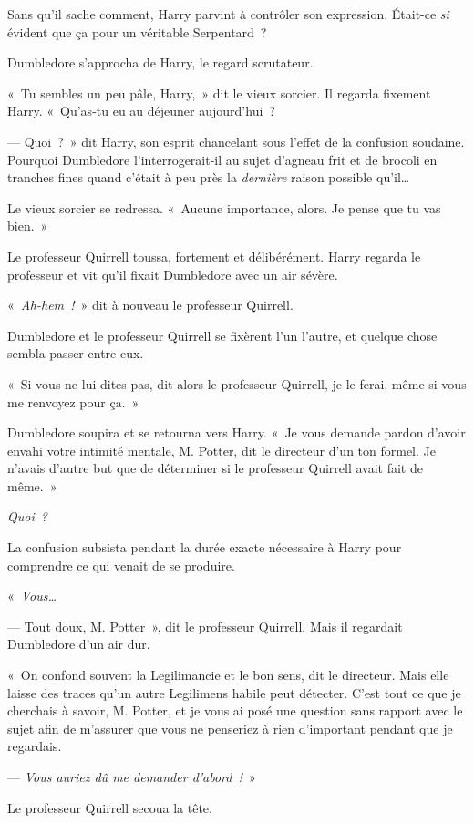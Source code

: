 Sans qu'il sache comment, Harry parvint à contrôler son expression.
Était-ce \emph{si} évident que ça pour un véritable Serpentard~?

Dumbledore s'approcha de Harry, le regard scrutateur.

«~Tu sembles un peu pâle, Harry,~» dit le vieux sorcier.
Il regarda fixement Harry.
«~Qu'as-tu eu au déjeuner aujourd'hui~?

--- Quoi~?~»
dit Harry, son esprit chancelant sous l'effet de la confusion soudaine.
Pourquoi Dumbledore l'interrogerait-il au sujet d'agneau frit et de brocoli en tranches fines quand c'était à peu près la \emph{dernière} raison possible qu'il…

Le vieux sorcier se redressa.
«~Aucune importance, alors.
Je pense que tu vas bien.~»

Le professeur Quirrell toussa, fortement et délibérément.
Harry regarda le professeur et vit qu'il fixait Dumbledore avec un air sévère.

«~\emph{Ah-hem~!}~» dit à nouveau le professeur Quirrell.

Dumbledore et le professeur Quirrell se fixèrent l'un l'autre, et quelque chose sembla passer entre eux.

«~Si vous ne lui dites pas, dit alors le professeur Quirrell, je le ferai, même si vous me renvoyez pour ça.~»

Dumbledore soupira et se retourna vers Harry.
«~Je vous demande pardon d'avoir envahi votre intimité mentale, M. Potter, dit le directeur d'un ton formel.
Je n'avais d'autre but que de déterminer si le professeur Quirrell avait fait de même.~»

\emph{Quoi~?}

La confusion subsista pendant la durée exacte nécessaire à Harry pour comprendre ce qui venait de se produire.

«~\emph{Vous…}

--- Tout doux, M. Potter~», dit le professeur Quirrell.
Mais il regardait Dumbledore d'un air dur.

«~On confond souvent la Legilimancie et le bon sens, dit le directeur.
Mais elle laisse des traces qu'un autre Legilimens habile peut détecter.
C'est tout ce que je cherchais à savoir, M. Potter, et je vous ai posé une question sans rapport avec le sujet afin de m'assurer que vous ne penseriez à rien d'important pendant que je regardais.

--- \emph{Vous auriez dû me demander d'abord~!}~»

Le professeur Quirrell secoua la tête.

